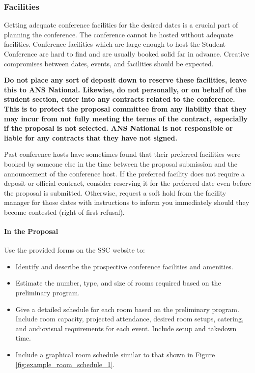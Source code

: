 \documentclass[12pt]{article}
\begin{document}
\subsubsection{Facilities}\label{sec:conference_facilities}

Getting adequate conference facilities for the desired dates is a crucial part of planning the conference. The conference cannot be hosted without adequate facilities. Conference facilities which are large enough to host the Student Conference are hard to find and are usually booked solid far in advance. Creative compromises between dates, events, and facilities should be expected.

\textbf{Do not place any sort of deposit down to reserve these facilities, leave this to ANS National. Likewise, do not personally, or on behalf of the student section, enter into any contracts related to the conference. This is to protect the proposal committee from any liability that they may incur from not fully meeting the terms of the contract, especially if the proposal is not selected. ANS National is not responsible or liable for any contracts that they have not signed.}

Past conference hosts have sometimes found that their preferred facilities were booked by someone else in the time between the proposal submission and the announcement of the conference host. If the preferred facility does not require a deposit or official contract, consider reserving it for the preferred date even before the proposal is submitted. Otherwise, request a soft hold from the facility manager for those dates with instructions to inform you immediately should they become contested (right of first refusal).

\paragraph{In the Proposal}
Use the provided forms on the SSC website to:
\begin{itemize}
    \item{Identify and describe the prospective conference facilities and amenities.}
    \item{Estimate the number, type, and size of rooms required based on the preliminary program.}
    \item{Give a detailed schedule for each room based on the preliminary program. Include room capacity, projected attendance, desired room setups, catering, and audiovisual requirements for each event. Include setup and takedown time.}
    \item{Include a graphical room schedule similar to that shown in Figure \ref{fig:example_room_schedule_1}.}
\end{itemize}
\end{document}
